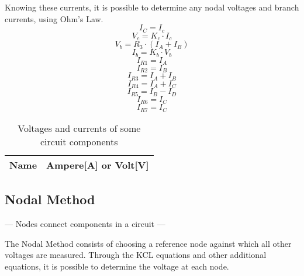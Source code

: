 Knowing these currents, it is possible to determine any nodal voltages and branch currents, using Ohm’s Law.
\begin{equation}
  I_C=I_c
\end{equation}
\begin{equation}
  V_c=K_c\cdot I_c
\end{equation}
\begin{equation}
  V_b=R_3\cdot (I_A+I_B)
\end{equation}
\begin{equation}
  I_b=K_b\cdot V_b
\end{equation}
\begin{equation}
  I_{R1}=I_A
\end{equation}
\begin{equation}
  I_{R2}=I_B
\end{equation}
\begin{equation}
  I_{R3}=I_A+I_B 
\end{equation}
\begin{equation}
  I_{R4}=I_A+I_C
\end{equation}
\begin{equation}
  I_{R5}=I_B - I_D
\end{equation}
\begin{equation}
  I_{R6}=I_C
\end{equation}
\begin{equation}
  I_{R7}=I_C
\end{equation}

\begin{table}[H]
  \centering
  \begin{tabular}{|l|r|}
    \hline    
    {\bf Name} & {\bf Ampere[A] or Volt[V]} \\ \hline
    
  \end{tabular}
  \caption{Voltages and currents of some circuit components}
  \label{tab:valm}
\end{table}
 
\subsection{Nodal Method}

--- Nodes connect components in a circuit ---

The Nodal Method consists of choosing a reference node against which all other voltages are measured. Through the KCL equations and other additional equations, it is possible to determine the voltage at each node.


